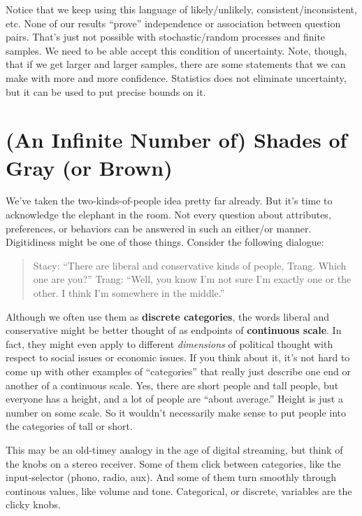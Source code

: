 \documentclass[openany]{book}
\begin{document}
Notice that we keep using this language of likely/unlikely, consistent/inconsistent, etc. None of our results ``prove'' independence or association between question pairs. That's just not possible with stochastic/random processes and finite samples. We need to be able accept this condition of uncertainty. Note, though, that if we get larger and larger samples, there are some statements that we can make with more and more confidence. Statistics does not eliminate uncertainty, but it can be used to put precise bounds on it.

\hypertarget{shades}{%
\chapter{(An Infinite Number of) Shades of Gray (or Brown)}\label{shades}}

We've taken the two-kinds-of-people idea pretty far already. But it's time to acknowledge the elephant in the room. Not every question about attributes, preferences, or behaviors can be answered in such an either/or manner. Digitidiness might be one of those things. Consider the following dialogue:

\begin{quote}
Stacy: ``There are liberal and conservative kinds of people, Trang. Which one are you?''
Trang: ``Well, you know I'm not sure I'm exactly one or the other. I think I'm somewhere in the middle.''
\end{quote}

Although we often use them as \textbf{discrete categories}, the words liberal and conservative might be better thought of as endpoints of \textbf{continuous scale}. In fact, they might even apply to different \emph{dimensions} of political thought with respect to social issues or economic issues. If you think about it, it's not hard to come up with other examples of ``categories'' that really just describe one end or another of a continuous scale. Yes, there are short people and tall people, but everyone has a height, and a lot of people are ``about average.'' Height is just a number on some scale. So it wouldn't necessarily make sense to put people into the categories of tall or short.

This may be an old-timey analogy in the age of digital streaming, but think of the knobs on a stereo receiver. Some of them click between categories, like the input-selector (phono, radio, aux). And some of them turn smoothly through continous values, like volume and tone. Categorical, or discrete, variables are the clicky knobs.
\end{document}
